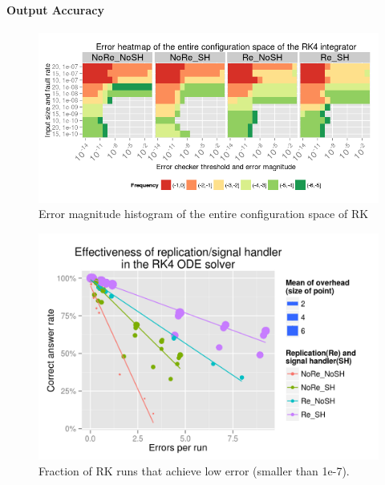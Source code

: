 \documentclass{sig-alternate}
\begin{document}
{\paragraph{Output Accuracy}

\begin{figure}[ht!]
\centering
\includegraphics[width=1.00\columnwidth]{figs/4_1_1_Exp2_2_Heatmap_Error_ConfSpace_RK4.png}
\caption{Error magnitude histogram of the entire configuration space of RK}
\label{fig:rt_algo_err_heatmap}
\end{figure}

\begin{figure}[ht!]
\centering
\includegraphics[width=1.00\columnwidth]{figs/4_1_2_Exp2_Effectiveness.png}
\caption{Fraction of RK runs that achieve low error (smaller than 1e-7).}
\label{fig:rk_effectiveness}
\end{figure}

}
\end{document}
